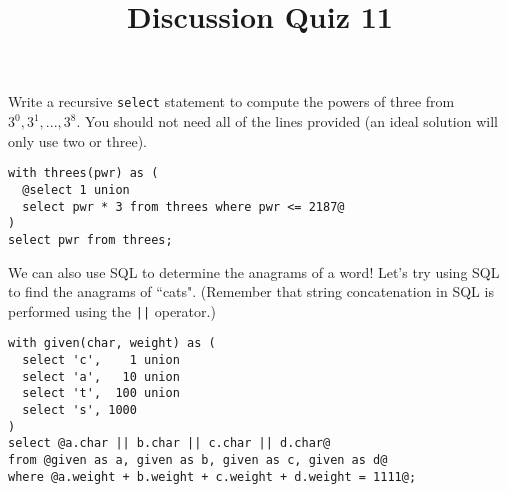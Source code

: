 \documentclass[twoside]{article}
\title{\sc Discussion Quiz 11 \solution{Solutions}}
\begin{document}
\maketitle

\begin{enumerate}

Write a recursive \lstinline{select} statement to compute the powers of three from $3^0, 3^1, ..., 3^8$. You should not need all of the lines provided (an ideal solution will only use two or three).
\vspace{0.1in}

\begin{lstlisting}
with threes(pwr) as (
  @select 1 union
  select pwr * 3 from threes where pwr <= 2187@
)
select pwr from threes;
\end{lstlisting}

\vspace{2in}


We can also use SQL to determine the anagrams of a word!
Let's try using SQL to find the anagrams of ``cats".
(Remember that string concatenation in SQL is performed using the \lstinline{||} operator.)
\vspace{0.1in}

\begin{lstlisting}
with given(char, weight) as (
  select 'c',    1 union
  select 'a',   10 union
  select 't',  100 union
  select 's', 1000
) 
select @a.char || b.char || c.char || d.char@
from @given as a, given as b, given as c, given as d@
where @a.weight + b.weight + c.weight + d.weight = 1111@;
\end{lstlisting}

\end{enumerate}
\end{document}

